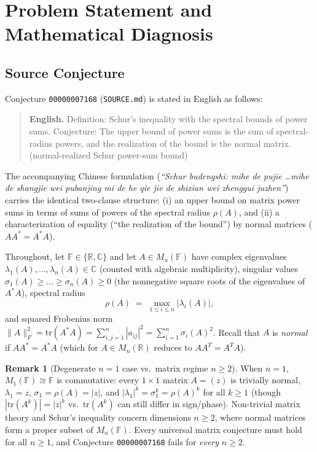 \documentclass[11pt,a4paper]{article}
\theoremstyle{plain}
\theoremstyle{definition}
\newtheorem{remark}[theorem]{Remark}
\newcommand{\C}{\mathbb{C}}
\newcommand{\R}{\mathbb{R}}
\newcommand{\tr}{\mathrm{tr}}
\begin{document}
\section{Problem Statement and Mathematical Diagnosis}

\subsection{Source Conjecture}
Conjecture \texttt{00000007168} (\texttt{SOURCE.md}) is stated in English as follows:
\begin{quote}
\textbf{English.} Definition: Schur's inequality with the spectral bounds of power sums. Conjecture: The upper bound of power sums is the sum of spectral-radius powers, and the realization of the bound is the normal matrix. (normal-realized Schur power-sum bound)
\end{quote}
The accompanying Chinese formulation (\emph{``Schur \textit{budengshi}: \textit{mihe de pujie} \dots \textit{mihe de shangjie wei pubanjing mi de he qie jie de shixian wei zhenggui juzhen}''}) carries the identical two-clause structure: (i) an upper bound on matrix power sums in terms of sums of powers of the spectral radius $\rho(A)$, and (ii) a characterization of equality (``the realization of the bound'') by normal matrices ($A A^* = A^* A$).

Throughout, let $\mathbb{F} \in \{\R, \C\}$ and let $A \in M_n(\mathbb{F})$ have complex eigenvalues $\lambda_1(A), \dots, \lambda_n(A) \in \C$ (counted with algebraic multiplicity), singular values $\sigma_1(A) \ge \dots \ge \sigma_n(A) \ge 0$ (the nonnegative square roots of the eigenvalues of $A^* A$), spectral radius
\[
  \rho(A) \;=\; \max_{1 \le i \le n} |\lambda_i(A)|,
\]
and squared Frobenius norm $\|A\|_F^2 = \tr(A^* A) = \sum_{i,j=1}^n |a_{ij}|^2 = \sum_{i=1}^n \sigma_i(A)^2$. Recall that $A$ is \emph{normal} if $A A^* = A^* A$ (which for $A \in M_n(\R)$ reduces to $A A^T = A^T A$).

\begin{remark}[Degenerate $n=1$ case vs.\ matrix regime $n \ge 2$]
When $n = 1$, $M_1(\mathbb{F}) \cong \mathbb{F}$ is commutative: every $1 \times 1$ matrix $A = (z)$ is trivially normal, $\lambda_1 = z$, $\sigma_1 = \rho(A) = |z|$, and $|\lambda_1|^k = \sigma_1^k = \rho(A)^k$ for all $k \ge 1$ (though $|\tr(A^k)| = |z|^k$ vs.\ $\tr(A^k)$ can still differ in sign/phase). Non-trivial matrix theory and Schur's inequality concern dimensions $n \ge 2$, where normal matrices form a proper subset of $M_n(\mathbb{F})$. Every universal matrix conjecture must hold for all $n \ge 1$, and Conjecture \texttt{00000007168} fails for \emph{every} $n \ge 2$.
\end{remark}
\end{document}
